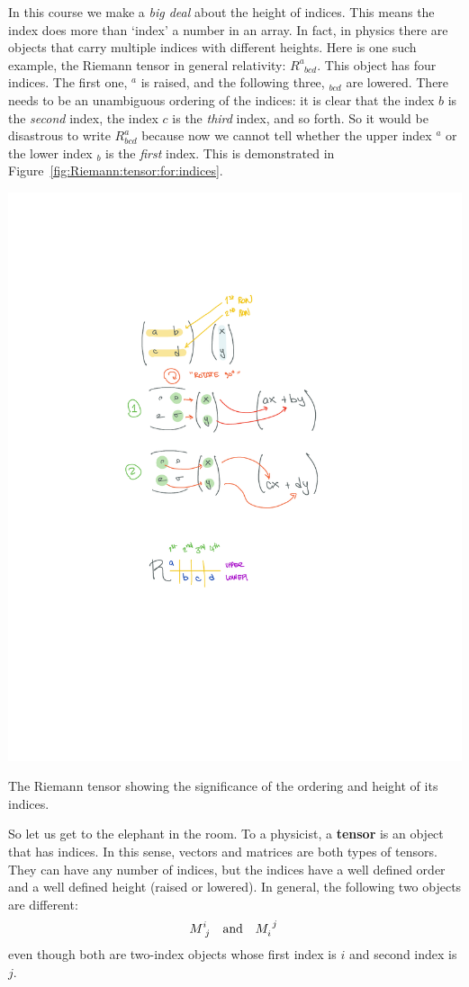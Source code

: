 \documentclass[12pt, oneside]{report}    %
\begin{document}
In this course we make a \emph{big deal} about the height of indices. This means the index does more than  `index' a number in an array. In fact, in physics there are objects that carry multiple indices with different heights. Here is one such example, the Riemann tensor in general relativity: $R^a_{\phantom{a}bcd}$. This object has four indices. The first one, $^a$ is raised, and the following three, $_{bcd}$ are lowered. There needs to be an unambiguous ordering of the indices: it is clear that the index $b$ is the \emph{second} index, the index $c$ is the \emph{third} index, and so forth. So it would be disastrous to write $R^a_{bcd}$ because now we cannot tell whether the upper index $^a$ or the lower index $_b$ is the \emph{first} index. This is demonstrated in Figure~\ref{fig:Riemann:tensor:for:indices}.
\begin{marginfigure}%
    \includegraphics[width=.8\textwidth]{figures/Rabcd_eg.pdf}
    \caption{The Riemann tensor showing the significance of the ordering and height of its indices.}
    \label{fig:Riemann:tensor:for:indices}
\end{marginfigure}

So let us get to the elephant in the room. To a physicist, a \textbf{tensor} is an object that has indices. In this sense, vectors and matrices are both types of tensors. They can have any number of indices, but the indices have a well defined order and a well defined height (raised or lowered). In general, the following two objects are different:
\begin{align}
    M\aij{i}{j} &&\text{and} && M_i^{\phantom{i}j} \,
\end{align}
even though both are two-index objects whose first index is $i$ and second index is $j$. 
\end{document}
